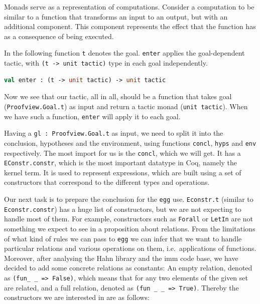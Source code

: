 \begin{definition}[Monad]
    Monads serve as a representation of computations. Consider a computation to be similar to a function that transforms an input to an output, but with an additional component. This component represents the effect that the function has as a consequence of being executed.
\end{definition}

In the following function \texttt{t} denotes the goal. \texttt{enter} applies the goal-dependent tactic, with \texttt{(t -> unit tactic)} type in each goal independently. 

\vspace{0.5cm}
\begin{lstlisting}[language=ocaml]
    val enter : (t -> unit tactic) -> unit tactic
\end{lstlisting}

Now we see that our tactic, all in all, should be a function that takes goal (\texttt{Proofview.Goal.t}) as input and return a tactic monad (\texttt{unit tactic}). When we have such a function, \texttt{enter} will apply it to each goal. 

Having a \texttt{gl {:} Proofview.Goal.t} as input, we need to split it into the conclusion, hypotheses and the environment, using functions \texttt{concl}, \texttt{hyps} and \texttt{env} respectively. The most import for us is the \texttt{concl}, which we will get. It has a \texttt{EConstr.constr}, which is the most important datatype in Coq, namely the kernel term. It is used to represent expressions, which are built using a set of constructors that correspond to the different types and operations. 

Our next task is to prepare the conclusion for the \texttt{egg} use. \texttt{Econstr.t} (similar to \texttt{Econstr.constr}) has a huge list of constructors, but we are not expecting to handle most of them. For example, constructors such as \texttt{Forall} or \texttt{LetIn} are not something we expect to see in a proposition about relations. From the limitations of what kind of rules we can pass to \texttt{egg} we can infer that we want to handle particular relations and various operations on them, i.e.\ applications of functions. Moreover, after analysing the Hahn library and the imm code base, we have decided to add some concrete relations as constants: An empty relation, denoted as \texttt{(fun\_ \_ => False)}, which means that for any two elements of the given set are related, and a full relation, denoted as \texttt{(fun \_ \_ => True)}. Thereby the constructors we are interested in are as follows: 

